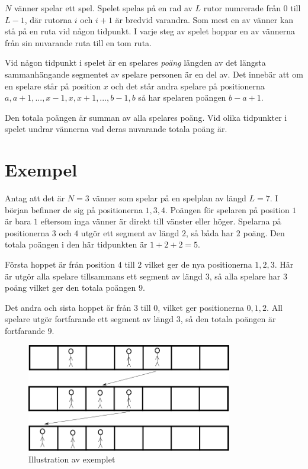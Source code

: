 \newcommand\version{v1}
$N$ vänner spelar ett spel. Spelet spelas på en rad av $L$ rutor numrerade från $0$ till $L - 1$, där rutorna $i$ och $i+1$ är bredvid varandra. Som mest en av vänner kan stå på en ruta vid någon tidpunkt. I varje steg av spelet hoppar en av vännerna från sin nuvarande ruta till en tom ruta.

Vid någon tidpunkt i spelet är en spelares \emph{poäng} längden av det längsta sammanhängande segmentet av spelare personen är en del av. Det innebär att om en spelare står på position $x$ och det står andra spelare på positionerna $a, a+1, ..., x-1, x, x+1, ..., b-1, b$ så har spelaren poängen $b - a + 1$.

Den totala poängen är summan av alla spelares poäng. Vid olika tidpunkter i spelet undrar vännerna vad deras nuvarande totala poäng är.


\section*{Exempel}
Antag att det är $N = 3$ vänner som spelar på en spelplan av längd $L = 7$. I början befinner de sig på positionerna
$1, 3, 4$. Poängen för spelaren på position $1$ är bara $1$ eftersom inga vänner är direkt till vänster eller höger.
Spelarna på positionerna $3$ och $4$ utgör ett segment av längd $2$, så båda har $2$ poäng. Den totala poängen i den här tidpunkten är $1 + 2 + 2 = 5$.

Första hoppet är från position $4$ till $2$ vilket ger de nya positionerna $1, 2, 3$. Här är utgör alla spelare tillsammans
ett segment av längd $3$, så alla spelare har $3$ poäng vilket ger den totala poängen $9$.

Det andra och sista hoppet är från $3$ till $0$, vilket ger positionerna $0, 1, 2$. All spelare utgör
fortfarande ett segment av längd $3$, så den totala poängen är fortfarande $9$.

\begin{figure}[h!]
  \centering
  \includegraphics[width=0.8\textwidth]{sample.png}
  \caption{Illustration av exemplet}
\end{figure}

